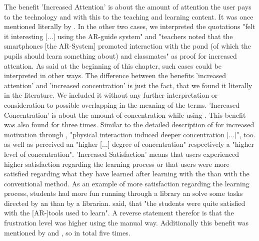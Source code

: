 The benefit 'Increased Attention' is about the amount of attention the user pays to the technology and with this to the teaching and learning content. It was once mentioned literally by \cite{VateULan.2012}.\autocite[cf.][894]{VateULan.2012} In the other two cases, we interpreted the quotations "felt it interesting [...] using the AR-guide system"\autocite[194]{Chen.2008} and 
"teachers noted that the smartphones [the AR-System] promoted interaction with the pond (of which the pupils should learn something about) and classmates"\autocite[552]{Kamarainen.2013} as proof for 
increased attention. As said at the beginning of this chapter, such cases could be interpreted in other ways.
The difference between the benefits 'increased attention' and 'increased concentration' is just the fact, that we found it literally in the literature. We included it
without any further interpretation or consideration to possible overlapping in the meaning of the terms.
'Increased Concentration' is about the amount of concentration while using \AR \appsns. This benefit was also found for three times. Similar to the detailed description of \cite{Iwata.2011} for increased motivation through \AR \appns, "physical interaction
induced deeper concentration [...]", too\autocite[9]{Iwata.2011}. \cite{Yen.2013} as well as \cite{Ibanez.2014} perceived an "higher [...] degree of concentration"\autocite[173]{Yen.2013} respectively a 
"higher level of concentration"\autocite[11]{Ibanez.2014}. 
'Increased Satisfaction' means that users experienced higher satisfaction regarding the learning process or that users were more satisfied regarding what they have learned after learning with the \AR \app than with the 
conventional method. As an example of more satisfaction regarding the learning process, students had more fun running through a library an solve some tasks directed by an \AR \app than by a librarian\autocite[649]{Chen.2012}.
\cite{MartinGutierrez.2013} said, that "the students were quite satisfied with the [AR-]tools used to learn"\autocite[6]{MartinGutierrez.2013}. A reverse statement therefor is that the frustration level was higher using the 
manual way\autocite[448]{Hou.2013}. Additionally this benefit was mentioned by \cite{Ibanez.2014} and \cite{Redondo.2013}, so in total five times.

% 
